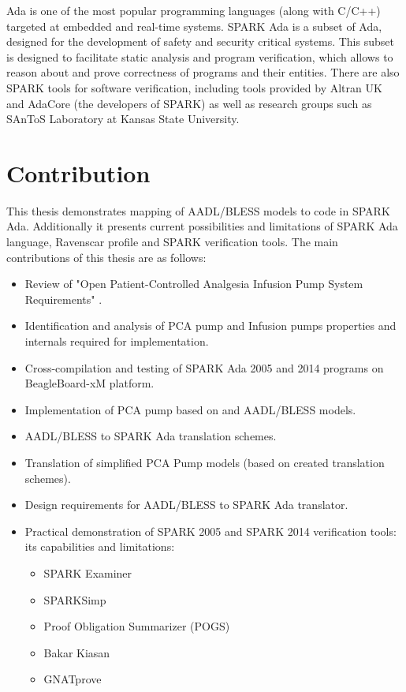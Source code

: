 Ada is one of the most popular programming languages (along with C/C++) targeted at embedded and real-time systems. SPARK Ada \cite{Barnes:Book} is a subset of Ada, designed for the development of safety and security critical systems. This subset is designed to facilitate static analysis and program verification, which allows to reason about and prove correctness of programs and their entities. There are also SPARK tools for software verification, including tools provided by Altran UK and AdaCore (the developers of SPARK) as well as research groups such as SAnToS Laboratory at Kansas State University.


\section{Contribution}
\label{introduction:contribution}
This thesis demonstrates mapping of AADL/BLESS models to code in SPARK Ada. Additionally it presents current possibilities and limitations of SPARK Ada language, Ravenscar profile and SPARK verification tools. The main contributions of this thesis are as follows:
\begin{itemize}
	\item Review of "Open Patient-Controlled Analgesia Infusion Pump System Requirements" \cite{PcaReq,OpenSourcePCAPump:Paper}.
	\item Identification and analysis of PCA pump and Infusion pumps properties and internals required for implementation.
	\item Cross-compilation and testing of SPARK Ada 2005 and 2014 programs on BeagleBoard-xM platform.
	\item Implementation of PCA pump based on \cite{PcaReq} and AADL/BLESS models.
	\item AADL/BLESS to SPARK Ada translation schemes.
	\item Translation of simplified PCA Pump models (based on created translation schemes).
	\item Design requirements for AADL/BLESS to SPARK Ada translator.
	\item Practical demonstration of SPARK 2005 and SPARK 2014 verification tools: its capabilities and limitations:
		\begin{itemize}
			\item SPARK Examiner
			\item SPARKSimp
			\item Proof Obligation Summarizer (POGS)
			\item Bakar Kiasan
			\item GNATprove
		\end{itemize}
\end{itemize}


